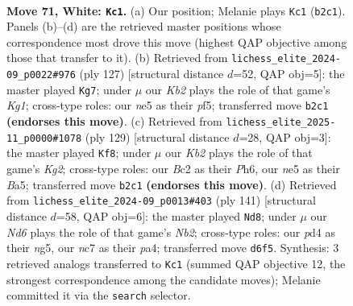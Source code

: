 \documentclass[11pt]{article}
\begin{document}
\clearpage

\begin{figure}[p]\centering
\begin{subfigure}{0.46\textwidth}\centering
\resizebox{\linewidth}{!}{%
\newchessgame
\chessboard[
  setfen={8/2n3k1/1b1N4/p3n3/P2pP3/1P5p/1KB1P3/8 w - - 8 71},
  showmover=false,
  pgfstyle=straightmove, color=movearrow, markmove={b2-c1}
]}
\caption{}
\end{subfigure}\hfill
\begin{subfigure}{0.46\textwidth}\centering
\resizebox{\linewidth}{!}{%
\newchessgame
\chessboard[
  setfen={6k1/4bp2/3p4/2pP1Pp1/2P5/2NK4/1B6/8 b - - 2 64},
  showmover=false,
  pgfstyle=straightmove, color=movearrow, markmove={g8-g7}
]}
\caption{}
\end{subfigure}
\\[4pt]
\begin{subfigure}{0.46\textwidth}\centering
\resizebox{\linewidth}{!}{%
\newchessgame
\chessboard[
  setfen={8/6k1/N3p2p/bn1bN1p1/4p3/6PP/1B3P2/5K2 b - - 0 65},
  showmover=false,
  pgfstyle=straightmove, color=movearrow, markmove={g7-f8}
]}
\caption{}
\end{subfigure}\hfill
\begin{subfigure}{0.46\textwidth}\centering
\resizebox{\linewidth}{!}{%
\newchessgame
\chessboard[
  setfen={8/pnbk4/1p6/2p3N1/P1P5/1P1K4/3B4/8 b - - 6 71},
  showmover=false,
  pgfstyle=straightmove, color=movearrow, markmove={b7-d8}
]}
\caption{}
\end{subfigure}
\caption{\textbf{Move 71, White: \texttt{Kc1}.} (a) Our position; Melanie plays \texttt{Kc1} (\texttt{b2c1}). Panels (b)--(d) are the retrieved master positions whose correspondence most drove this move (highest QAP objective among those that transfer to it). (b) Retrieved from \texttt{lichess\_elite\_2024-09\_p0022\#976} (ply 127) [structural distance $d$=52, QAP obj=5]: the master played \texttt{Kg7}; under $\mu$ our \emph{Kb2} plays the role of that game's \emph{Kg1}; cross-type roles: our \emph{n}e5 as their \emph{p}f5; transferred move \texttt{b2c1} \textbf{(endorses this move)}. (c) Retrieved from \texttt{lichess\_elite\_2025-11\_p0000\#1078} (ply 129) [structural distance $d$=28, QAP obj=3]: the master played \texttt{Kf8}; under $\mu$ our \emph{Kb2} plays the role of that game's \emph{Kg2}; cross-type roles: our \emph{B}c2 as their \emph{P}h6, our \emph{n}e5 as their \emph{B}a5; transferred move \texttt{b2c1} \textbf{(endorses this move)}. (d) Retrieved from \texttt{lichess\_elite\_2024-09\_p0013\#403} (ply 141) [structural distance $d$=58, QAP obj=6]: the master played \texttt{Nd8}; under $\mu$ our \emph{Nd6} plays the role of that game's \emph{Nb2}; cross-type roles: our \emph{p}d4 as their \emph{n}g5, our \emph{n}c7 as their \emph{p}a4; transferred move \texttt{d6f5}. Synthesis: 3 retrieved analogs transferred to \texttt{Kc1} (summed QAP objective 12, the strongest correspondence among the candidate moves); Melanie committed it via the \texttt{search} selector.}
\label{fig:thought-m140}
\end{figure}
\end{document}
